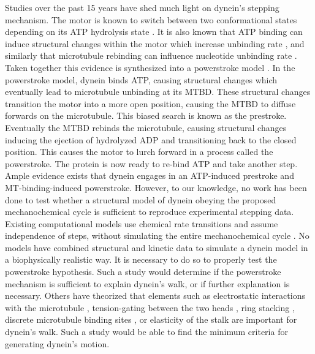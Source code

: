 \documentclass[9pt,twocolumn,twoside]{pnas-new}
\begin{document}
Studies over the past 15 years have shed much light on dynein's stepping mechanism. The motor is known to switch between two conformational states depending on its ATP hydrolysis state \cite{burgess-paper, FRETstatepaper, carter-paper, nicastro, schmidt-carter}. It is also known that ATP binding can induce structural changes within the motor which increase unbinding rate \cite{leschziner, carter-paper}, and similarly that microtubule rebinding can influence nucleotide unbinding rate \cite{mt-atp-coupling}. Taken together this evidence is synthesized into a powerstroke model \cite{cianfroccoreview, imamulamodel}. In the powerstroke model, dynein binds ATP, causing structural changes which eventually lead to microtubule unbinding at its MTBD. These structural changes transition the motor into a more open position, causing the MTBD to diffuse forwards on the microtubule. This biased search is known as the prestroke. Eventually the MTBD rebinds the microtubule, causing structural changes inducing the ejection of hydrolyzed ADP and transitioning back to the closed position. This causes the motor to lurch forward in a process called the powerstroke. The protein is now ready to re-bind ATP and take another step.\\

Ample evidence exists that dynein engages in an ATP-induced prestroke and MT-binding-induced powerstroke. However, to our knowledge, no work has been done to test whether a structural model of dynein obeying the proposed mechanochemical cycle is sufficient to reproduce experimental stepping data. Existing computational models use chemical rate transitions and assume independence of steps, without simulating the entire mechanochemical cycle \cite{sarlahmodel}. No models have combined structural and kinetic data to simulate a dynein model in a biophysically realistic way. It is necessary to do so to properly test the powerstroke hypothesis. Such a study would determine if the powerstroke mechanism is sufficient to explain dynein's walk, or if further explanation is necessary. Others have theorized that elements such as electrostatic interactions with the microtubule \cite{longrangemt}, tension-gating between the two heads \cite{yildizcleary}, ring stacking \cite{sarlahmodel}, discrete microtubule binding sites \cite{trottmodel}, or elasticity of the stalk \cite{burgess-paper} are important for dynein's walk. Such a study would be able to find the minimum criteria for generating dynein's motion.\\
\end{document}

